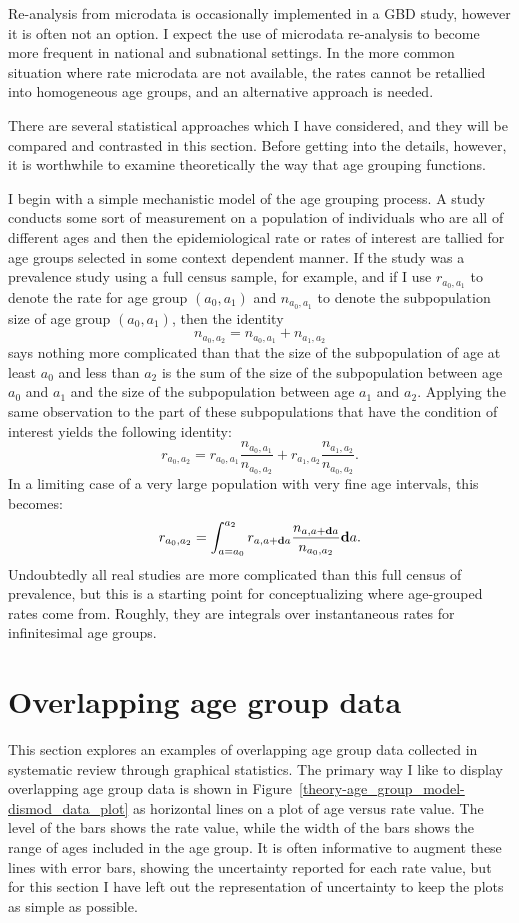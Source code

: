 Re-analysis from microdata is occasionally implemented in a GBD study,
however it is often not an option.  I expect the use of microdata
re-analysis to become more frequent in national and subnational
settings.  In the more common situation where rate microdata are not
available, the rates cannot be retallied into homogeneous age groups,
and an alternative approach is needed.

There are several statistical approaches which I have considered, and
they will be compared and contrasted in this section.  Before getting
into the details, however, it is worthwhile to examine theoretically
the way that age grouping functions.

I begin with a simple mechanistic model of the age grouping process.
A study conducts some sort of measurement on a population of
individuals who are all of different ages and then the
epidemiological rate or rates of interest are tallied for age groups
selected in some context dependent manner. If the study was a
prevalence study using a full census sample, for example, and if I use
$r_{a_0,a_1}$ to denote the rate for age group $(a_0, a_1)$ and
$n_{a_0,a_1}$ to denote the subpopulation size of age group
$(a_0,a_1)$, then the identity
\[
n_{a_0, a_2} = n_{a_0,a_1} + n_{a_1,a_2}
\]
says nothing more complicated than that the size of the subpopulation
of age at least $a_0$ and less than $a_2$ is the sum of the size of
the subpopulation between age $a_0$ and $a_1$ and the size of the
subpopulation between age $a_1$ and $a_2$.  Applying the same
observation to the part of these subpopulations that have the condition
of interest yields the following identity:
\[
r_{a_0,a_2} = r_{a_0,a_1}\frac{n_{a_0,a_1}}{n_{a_0,a_2}} + r_{a_1,a_2}\frac{n_{a_1,a_2}}{n_{a_0,a_2}}. 
\] 
In a limiting case of a very large population with very fine age
intervals, this becomes:
\[
r_{a_0,a_2} = \int_{a=a_0}^{a_2} r_{a,a+\mathbf{d} a}\frac{n_{a,a+\mathbf{d} a}}{n_{a_0,a_2}}\mathbf{d} a.
\]
Undoubtedly all real studies are more complicated than this full
census of prevalence, but this is a starting point for conceptualizing
where age-grouped rates come from.  Roughly, they are integrals over
instantaneous rates for infinitesimal age groups.

\section{Overlapping age group data}
\label{theory-age_group_model-overlapping_data}
This section explores an examples of overlapping age group data
collected in systematic review through graphical statistics.  The
primary way I like to display overlapping age group data is shown in
Figure~\ref{theory-age_group_model-dismod_data_plot} as horizontal
lines on a plot of age versus rate value.  The level of the bars shows
the rate value, while the width of the bars shows the range of ages
included in the age group. It is often informative to augment these
lines with error bars, showing the uncertainty reported for each rate
value, but for this section I have left out the representation of
uncertainty to keep the plots as simple as possible.

